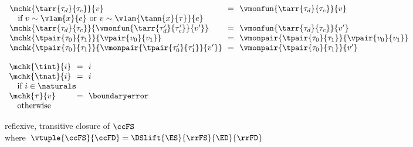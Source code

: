\begin{flushleft}
\medskip
{}\\
\begin{minipage}[t]{\columnwidth}
$\begin{array}{l@{~~}c@{~~}l}
  \mchk{\tarr{\tau_d}{\tau_c}}{v} & = & \vmonfun{\tarr{\tau_d}{\tau_c}}{v}
\\ \multicolumn{3}{l}{\mbox{\quad if $v \sim \vlam{x}{e}$ or $v \sim \vlam{\tann{x}{\tau}}{e}$}}
\\
  \mchk{\tarr{\tau_d}{\tau_c}}{\vmonfun{\tarr{\tau_d'}{\tau_c'}}{v'}} & = & \vmonfun{\tarr{\tau_d}{\tau_c}}{v'}
\\
  \mchk{\tpair{\tau_0}{\tau_1}}{\vpair{v_0}{v_1}} & = & \vmonpair{\tpair{\tau_0}{\tau_1}}{\vpair{v_0}{v_1}}
\\
  \mchk{\tpair{\tau_0}{\tau_1}}{\vmonpair{\tpair{\tau_0'}{\tau_1'}}{v'}} & = & \vmonpair{\tpair{\tau_0}{\tau_1}}{v'}
\end{array}$
\end{minipage}\hspace{\columnsep}%
\begin{minipage}[t]{\columnwidth}
$\begin{array}{l@{~~}c@{~~}l}
  \mchk{\tint}{i} & = & i
\\
  \mchk{\tnat}{i} & = & i
\\ \multicolumn{3}{l}{\mbox{\quad if $i \in \naturals$}}
\\
  \mchk{\tau}{v} & = & \boundaryerror
\\ \multicolumn{3}{l}{\mbox{\quad otherwise}}
\end{array}$
\end{minipage}

\medskip
{} reflexive, transitive closure of $\ccFS$\\
\mbox{\quad where $\vtuple{\ccFS}{\ccFD} = \DSlift{\ES}{\rrFS}{\ED}{\rrFD}$}
\end{flushleft}
